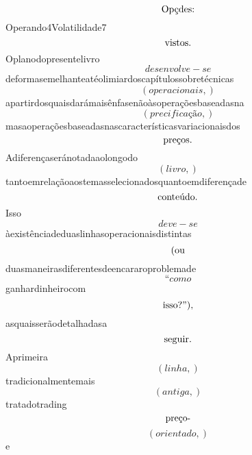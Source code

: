 \documentclass{article}
\begin{document}
\begin{equation}
$Opçdes:$
\end{equation}Operando4Volatilidade7\begin{equation}
$vistos.$
\end{equation}Oplanodopresentelivro\begin{equation}
desenvolve - se
\end{equation}deformasemelhanteatéolimiardoscapítulossobretécnicas\begin{equation}
\left( operacionais,\right)
\end{equation}apartirdosquaisdarámaisênfasenãoàsoperaçõesbaseadasna\begin{equation}
\left( precificação,\right)
\end{equation}masaoperaçõesbaseadasnascaracterísticasvariacionaisdos\begin{equation}
$preços.$
\end{equation}Adiferençaseránotadaaolongodo\begin{equation}
\left( livro,\right)
\end{equation}tantoemrelaçãoaostemasselecionadosquantoemdiferençade\begin{equation}
$conteúdo.$
\end{equation}Isso\begin{equation}
deve - se
\end{equation}àexistênciadeduaslinhasoperacionaisdistintas\begin{equation}
$(ou$
\end{equation}duasmaneirasdiferentesdeencararoproblemade\begin{equation}
“como
\end{equation}ganhardinheirocom\begin{equation}
$isso?”),$
\end{equation}asquaisserãodetalhadasa\begin{equation}
$seguir.$
\end{equation}Aprimeira\begin{equation}
\left( linha,\right)
\end{equation}tradicionalmentemais\begin{equation}
\left( antiga,\right)
\end{equation}tratadotrading\begin{equation}
$preço-$
\end{equation}\begin{equation}
\left( orientado,\right)
\end{equation}e\begin{equation}

\end{equation}
\end{document}
